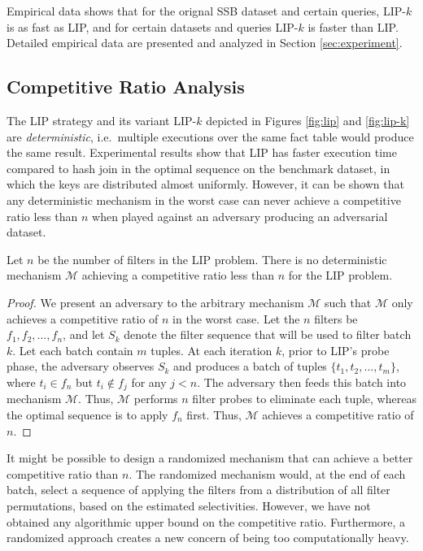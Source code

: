 Empirical data shows that for the orignal SSB dataset and certain queries, LIP-$k$ is as fast as LIP, and for certain datasets and queries LIP-$k$ is faster than LIP. Detailed empirical data are presented and analyzed in Section \ref{sec:experiment}.



\subsection{Competitive Ratio Analysis}

The LIP strategy and its variant LIP-$k$ depicted in Figures \ref{fig:lip} and \ref{fig:lip-k} are \textit{deterministic}, i.e.\ multiple executions over the same fact table would produce the same result. Experimental results show that LIP has faster execution time compared to hash join in the optimal sequence \cite{zhu2017looking} on the benchmark dataset, in which the keys are distributed almost uniformly. However, it can be shown that any deterministic mechanism in the worst case can never achieve a competitive ratio less than $n$ when played against an adversary producing an adversarial dataset.


\begin{theorem}\label{thm:det-n}
	Let $n$ be the number of filters in the LIP problem. There is no deterministic mechanism $\mathcal{M}$ achieving a competitive ratio less than $n$ for the \textsc{LIP} problem.

\end{theorem}

\begin{proof}
	We present an adversary to the arbitrary mechanism $\mathcal{M}$ such that $\mathcal{M}$ only achieves a competitive ratio of $n$ in the worst case. 
	Let the $n$ filters be $f_1, f_2, \dots, f_n$, 
	and let $S_k$ denote the filter sequence that will be used to filter batch $k$. 
	Let each batch contain $m$ tuples.
	At each iteration $k$, prior to LIP's probe phase, the adversary observes $S_k$ and produces a batch of tuples $\{t_1, t_2, \dots, t_m\}$, where $t_i \in f_n$ but $t_i \notin f_j$ for any $j < n$. The adversary then feeds this batch into mechanism $\mathcal{M}$. Thus, $\mathcal{M}$ performs $n$ filter probes to eliminate each tuple, whereas the optimal sequence is to apply $f_n$ first. Thus, $\mathcal{M}$ achieves a competitive ratio of $n$.
\end{proof}

It might be possible to design a randomized mechanism that can achieve a better competitive ratio than $n$. The randomized mechanism would, at the end of each batch, select a sequence of applying the filters from a distribution of all filter permutations, based on the estimated selectivities. However, we have not obtained any algorithmic upper bound on the competitive ratio. Furthermore, a randomized approach creates a new concern of being too computationally heavy.

